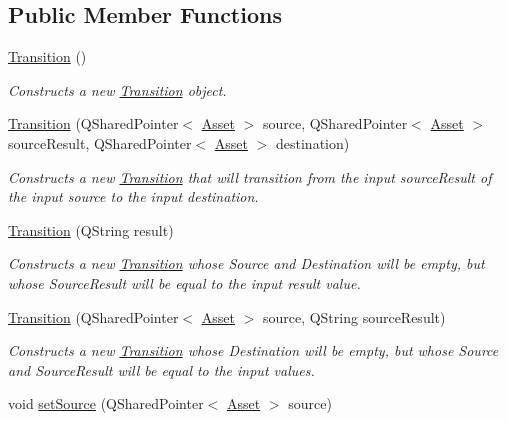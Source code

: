 \subsection*{Public Member Functions}
\begin{DoxyCompactItemize}
\item 
\hyperlink{class_picto_1_1_transition_a362e73e8011a4199789c8f7937b7a242}{Transition} ()
\begin{DoxyCompactList}\small\item\em Constructs a new \hyperlink{class_picto_1_1_transition}{Transition} object. \end{DoxyCompactList}\item 
\hyperlink{class_picto_1_1_transition_a81a0002a625b2b05db0a9035da0bf802}{Transition} (Q\-Shared\-Pointer$<$ \hyperlink{class_picto_1_1_asset}{Asset} $>$ source, Q\-Shared\-Pointer$<$ \hyperlink{class_picto_1_1_asset}{Asset} $>$ source\-Result, Q\-Shared\-Pointer$<$ \hyperlink{class_picto_1_1_asset}{Asset} $>$ destination)
\begin{DoxyCompactList}\small\item\em Constructs a new \hyperlink{class_picto_1_1_transition}{Transition} that will transition from the input source\-Result of the input source to the input destination. \end{DoxyCompactList}\item 
\hyperlink{class_picto_1_1_transition_a7ea04c67a131b5ef121f6ae0a78e964f}{Transition} (Q\-String result)
\begin{DoxyCompactList}\small\item\em Constructs a new \hyperlink{class_picto_1_1_transition}{Transition} whose Source and Destination will be empty, but whose Source\-Result will be equal to the input result value. \end{DoxyCompactList}\item 
\hyperlink{class_picto_1_1_transition_a125b05701af48c216442bf6f65a58449}{Transition} (Q\-Shared\-Pointer$<$ \hyperlink{class_picto_1_1_asset}{Asset} $>$ source, Q\-String source\-Result)
\begin{DoxyCompactList}\small\item\em Constructs a new \hyperlink{class_picto_1_1_transition}{Transition} whose Destination will be empty, but whose Source and Source\-Result will be equal to the input values. \end{DoxyCompactList}\item 
\hypertarget{class_picto_1_1_transition_a6337d91a2ed102e66cee2dfb55bc0631}{void \hyperlink{class_picto_1_1_transition_a6337d91a2ed102e66cee2dfb55bc0631}{set\-Source} (Q\-Shared\-Pointer$<$ \hyperlink{class_picto_1_1_asset}{Asset} $>$ source)}\label{class_picto_1_1_transition_a6337d91a2ed102e66cee2dfb55bc0631}


\end{DoxyCompactItemize}
